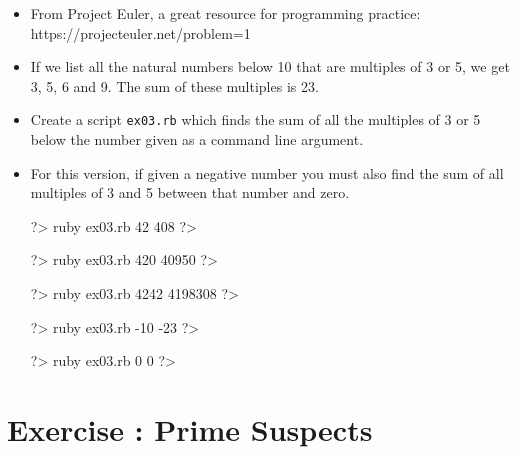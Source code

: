 \documentclass{42-en}
\begin{document}
\exnumber{\exercicenumber}


\begin{itemize}

\item From Project Euler, a great resource for programming practice:\\
https://projecteuler.net/problem=1
\item If we list all the natural numbers below 10 that are multiples of 3 or 5, we get 3, 5, 6 and 9. The sum of these multiples is 23.
\item Create a script \texttt{ex03.rb} which finds the sum of all the multiples of 3 or 5 below the number given as a command line argument.
\item For this version, if given a negative number you must also find the sum of all multiples of 3 and 5 between that number and zero.

\begin{42console}
	?> ruby ex03.rb 42
	408
	?>
\end{42console}

\begin{42console}
	?> ruby ex03.rb 420
	40950
	?>
\end{42console}

\begin{42console}
	?> ruby ex03.rb 4242
	4198308
	?>
\end{42console}

\begin{42console}
	?> ruby ex03.rb -10
	-23
	?>
\end{42console}

\begin{42console}
	?> ruby ex03.rb 0
	0
	?>
\end{42console}

\end{itemize}



\chapter{Exercise \exercicenumber: Prime Suspects}
\end{document}
